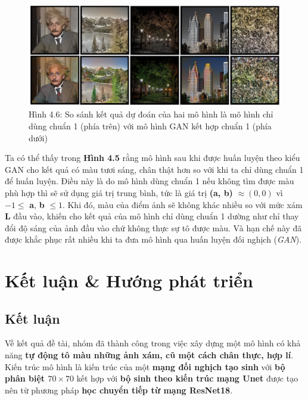 \documentclass[a4paper]{article}
\begin{document}
\begin{figure}[h!]
\centering
\includegraphics[width=15cm]{images/4_3.PNG}
\caption{Hình 4.6: So sánh kết quả dự đoán của hai mô hình là mô hình chỉ dùng chuẩn 1 (phía trên) với mô hình GAN kết hợp chuẩn 1 (phía dưới)}
\end{figure}

\noindent
Ta có thể thấy trong \textbf{Hình 4.5} rằng mô hình sau khi được huấn luyện theo kiểu GAN cho kết quả có màu tươi sáng, chân thật hơn so với khi ta chỉ dùng chuẩn 1 để huấn luyện. Điều này là do mô hình dùng chuẩn 1 nếu không tìm được màu phù hợp thì sẽ sử dụng giá trị trung bình, tức là giá trị \textbf{(a, b)} $\approx (0, 0)$ vì $-1 \le$ \textbf{a}, \textbf{b} $\le 1$. Khi đó, màu của điểm ảnh sẽ không khác nhiều so với mức xám \textbf{L} đầu vào, khiến cho kết quả của mô hình chỉ dùng chuẩn 1 dường như chỉ thay đổi độ sáng của ảnh đầu vào chứ không thực sự tô được màu. Và hạn chế này đã được khắc phục rất nhiều khi ta đưa mô hình qua huấn luyện đối nghịch (\textit{GAN}).

\section{Kết luận \& Hướng phát triển}

\subsection{Kết luận}
Về kết quả đề tài, nhóm đã thành công trong việc xây dựng một mô hình có khả năng \textbf{tự động tô màu những ảnh xám, cũ một cách chân thực, hợp lí}. Kiến trúc mô hình là kiến trúc của một \textbf{mạng đối nghịch tạo sinh} với \textbf{bộ phân biệt $70 \times 70$} kết hợp với \textbf{bộ sinh theo kiến trúc mạng Unet} được tạo nên từ phương pháp \textbf{học chuyển tiếp từ mạng ResNet18}.\\
\end{document}
